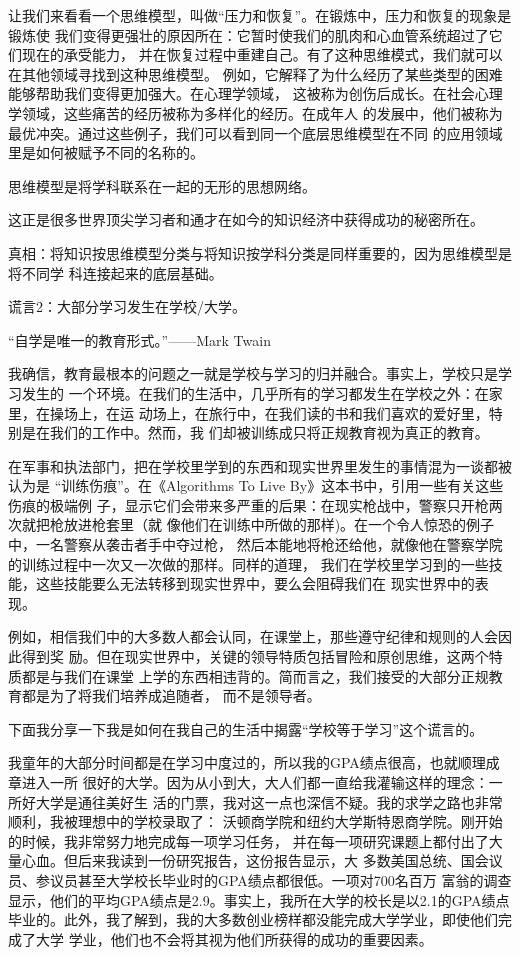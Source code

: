 \documentclass[11pt]{ctexart}
\begin{document}
{{{{让我们来看看一个思维模型，叫做“压力和恢复”。在锻炼中，压力和恢复的现象是锻炼使
我们变得更强壮的原因所在：它暂时使我们的肌肉和心血管系统超过了它们现在的承受能力，
并在恢复过程中重建自己。有了这种思维模式，我们就可以在其他领域寻找到这种思维模型。
例如，它解释了为什么经历了某些类型的困难能够帮助我们变得更加强大。在心理学领域，
这被称为创伤后成长。在社会心理学领域，这些痛苦的经历被称为多样化的经历。在成年人
的发展中，他们被称为最优冲突。通过这些例子，我们可以看到同一个底层思维模型在不同
的应用领域里是如何被赋予不同的名称的。

思维模型是将学科联系在一起的无形的思想网络。



﻿﻿这正是很多世界顶尖学习者和通才在如今的知识经济中获得成功的秘密所在。

真相：将知识按思维模型分类与将知识按学科分类是同样重要的，因为思维模型是将不同学
科连接起来的底层基础。

谎言2：大部分学习发生在学校/大学。

“自学是唯一的教育形式。”——Mark Twain

我确信，教育最根本的问题之一就是学校与学习的归并融合。事实上，学校只是学习发生的
一个环境。在我们的生活中，几乎所有的学习都发生在学校之外：在家里，在操场上，在运
动场上，在旅行中，在我们读的书和我们喜欢的爱好里，特别是在我们的工作中。然而，我
们却被训练成只将正规教育视为真正的教育。

在军事和执法部门，把在学校里学到的东西和现实世界里发生的事情混为一谈都被认为是
“训练伤痕”。在《Algorithms To Live By》这本书中，引用一些有关这些伤痕的极端例
子，显示它们会带来多严重的后果：在现实枪战中，警察只开枪两次就把枪放进枪套里（就
像他们在训练中所做的那样)。在一个令人惊恐的例子中，一名警察从袭击者手中夺过枪，
然后本能地将枪还给他，就像他在警察学院的训练过程中一次又一次做的那样。同样的道理，
我们在学校里学习到的一些技能，这些技能要么无法转移到现实世界中，要么会阻碍我们在
现实世界中的表现。

例如，相信我们中的大多数人都会认同，在课堂上，那些遵守纪律和规则的人会因此得到奖
励。但在现实世界中，关键的领导特质包括冒险和原创思维，这两个特质都是与我们在课堂
上学的东西相违背的。简而言之，我们接受的大部分正规教育都是为了将我们培养成追随者，
而不是领导者。

下面我分享一下我是如何在我自己的生活中揭露“学校等于学习”这个谎言的。

我童年的大部分时间都是在学习中度过的，所以我的GPA绩点很高，也就顺理成章进入一所
很好的大学。因为从小到大，大人们都一直给我灌输这样的理念：一所好大学是通往美好生
活的门票，我对这一点也深信不疑。我的求学之路也非常顺利，我被理想中的学校录取了：
沃顿商学院和纽约大学斯特恩商学院。刚开始的时候，我非常努力地完成每一项学习任务，
并在每一项研究课题上都付出了大量心血。但后来我读到一份研究报告，这份报告显示，大
多数美国总统、国会议员、参议员甚至大学校长毕业时的GPA绩点都很低。一项对700名百万
富翁的调查显示，他们的平均GPA绩点是2.9。事实上，我所在大学的校长是以2.1的GPA绩点
毕业的。此外，我了解到，我的大多数创业榜样都没能完成大学学业，即使他们完成了大学
学业，他们也不会将其视为他们所获得的成功的重要因素。

}}}}
\end{document}
